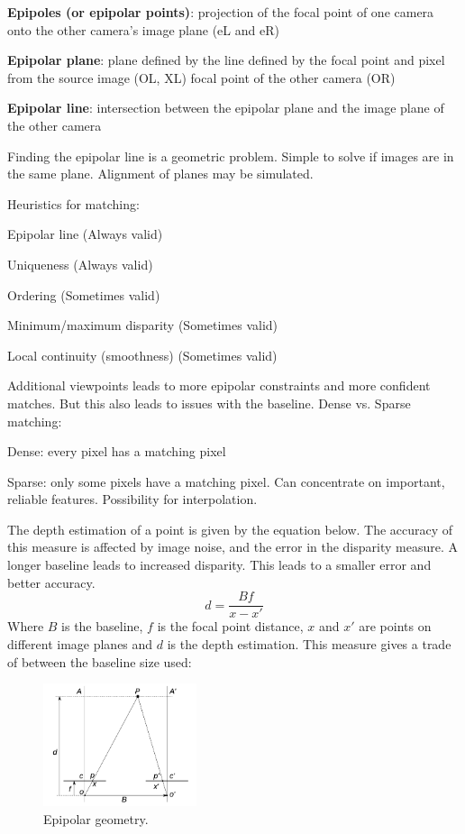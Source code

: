 \documentclass[8pt]{extarticle}
\begin{document}
\begin{multicols}{2}
\textbf{Epipoles (or epipolar points)}: projection of the focal point of one camera onto the other camera’s image plane (eL and eR)

\textbf{Epipolar plane}: plane defined by the line defined by the focal point and pixel from the source image (OL, XL) focal point of the other camera (OR)

\textbf{Epipolar line}: intersection between the epipolar plane and the image plane of the other camera

Finding the epipolar line is a geometric problem. Simple to solve if images are in the same plane. Alignment of planes may be simulated.

Heuristics for matching:
\begin{compactitem}
    \item Epipolar line (Always valid)
    \item Uniqueness (Always valid)
    \item Ordering (Sometimes valid)
    \item Minimum/maximum disparity (Sometimes valid)
    \item Local continuity (smoothness) (Sometimes valid)
\end{compactitem}

Additional viewpoints leads to more epipolar constraints and more confident matches. But this also leads to issues with the baseline. Dense vs. Sparse matching:
\begin{compactitem}
\item Dense: every pixel has a matching pixel
\item Sparse: only some pixels have a matching pixel. Can concentrate on important, reliable features. Possibility for interpolation.
\end{compactitem}

The depth estimation of a point is given by the equation below. The accuracy of this measure is affected by image noise, and the error in the disparity measure. A longer baseline leads to increased disparity. This leads to a smaller error and better accuracy.
\begin{equation}
    d = \frac{Bf}{x-x'}
\end{equation}
Where $B$ is the baseline, $f$ is the focal point distance, $x$ and $x'$ are points on different image planes and $d$ is the depth estimation. This measure gives a trade of between the baseline size used:

\begin{figure}[H]
    \centering
    \includegraphics[width=0.4\textwidth]{stereo.png}
    \caption{Epipolar geometry.}
    \label{fig:Stereo depth.}
\end{figure}



\end{multicols}
\end{document}
